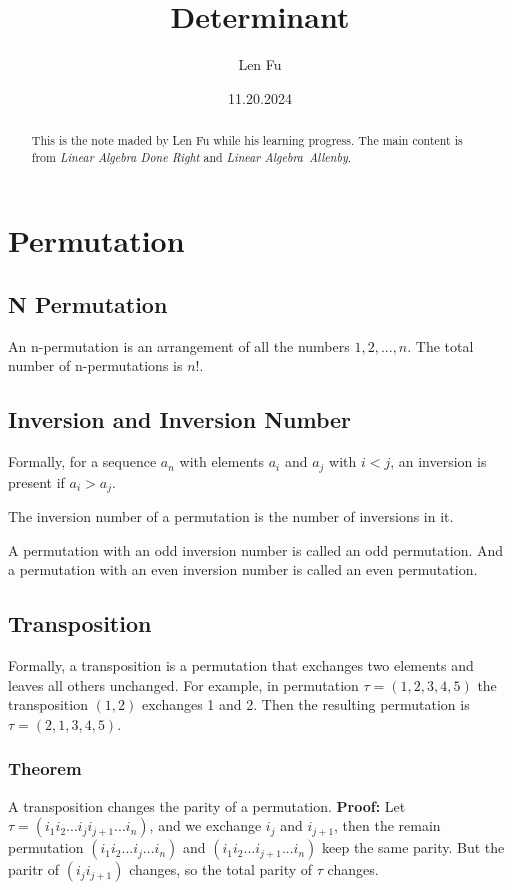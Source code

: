 \documentclass{article}
\title{Determinant}
\author{Len Fu}
\date{11.20.2024}
\begin{document}
\maketitle

\begin{abstract}
    This is the note maded by Len Fu while his learning progress.
    The main content is from \textit{Linear Algebra Done Right} and \textit{Linear Algebra\  Allenby}.
\end{abstract}

\tableofcontents
\newpage

\section{Permutation}

\subsection{N Permutation}
An n-permutation is an arrangement of all the numbers $1,2,...,n$.
The total number of n-permutations is $n!$.
\subsection{Inversion and Inversion Number}
Formally, for a sequence ${a_{n}}$ with elements 
$a_{i}$ and $a_{j}$ with $i<j$, an inversion is 
present if $a_{i}>a_{j}$.

The inversion number of a permutation is the number of inversions in it.

A permutation with an odd inversion number is called 
an odd permutation. And a permutation with an even inversion number 
is called an even permutation.

\subsection{Transposition}
Formally, a transposition is a permutation that 
exchanges two elements and leaves all others unchanged.
For example, in permutation $\tau=(1,2,3,4,5)$ the 
transposition $(1,2)$ exchanges 1 and 2.
Then the resulting permutation is $\tau=(2,1,3,4,5)$.

\subsubsection{Theorem}
A transposition changes the parity of a permutation.
\textbf{Proof:}\newline
Let $\tau = (i_{1}i_{2}...i_{j}i_{j+1}...i_{n})$, and 
we exchange $i_{j}$ and $i_{j+1}$, then the remain permutation 
$(i_{1}i_{2}...i_{j}...i_{n})$ and $(i_{1}i_{2}...i_{j+1}...i_{n})$ 
keep the same parity. But the paritr of $(i_{j}i_{j+1})$ changes,
so the total parity of $\tau$ changes.
\end{document}

